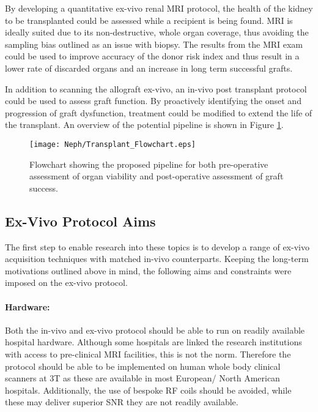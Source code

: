 By developing a quantitative ex-vivo renal \ac{MRI} protocol, the health of the kidney to be transplanted could be assessed while a recipient is being found. \ac{MRI} is ideally suited due to its non-destructive, whole organ coverage, thus avoiding the sampling bias outlined as an issue with biopsy. The results from the \ac{MRI} exam could be used to improve accuracy of the donor risk index and thus result in a lower rate of discarded organs and an increase in long term successful grafts. 

In addition to scanning the allograft ex-vivo, an in-vivo post transplant protocol could be used to assess graft function. By proactively identifying the onset and progression of graft dysfunction, treatment could be modified to extend the life of the transplant. An overview of the potential pipeline is shown in Figure \ref{fig:ex_transplant_flowchart}.
\begin{figure}[H]
	\centering
	\texttt{[image: Neph/Transplant\_Flowchart.eps]}
	\caption{Flowchart showing the proposed pipeline for both pre-operative assessment of organ viability and post-operative assessment of graft success.}
	\label{fig:ex_transplant_flowchart}	
\end{figure}

\newpage
\subsection{Ex-Vivo Protocol Aims}

The first step to enable research into these topics is to develop a range of ex-vivo acquisition techniques with matched in-vivo counterparts. Keeping the long-term motivations outlined above in mind, the following aims and constraints were imposed on the ex-vivo protocol.

\paragraph{Hardware:} Both the in-vivo and ex-vivo protocol should be able to run on readily available hospital hardware. Although some hospitals are linked the research institutions with access to pre-clinical \ac{MRI} facilities, this is not the norm. Therefore the protocol should be able to be implemented on human whole body clinical scanners at 3T as these are available in most European/ North American hospitals. Additionally, the use of bespoke \ac{RF} coils should be avoided, while these may deliver superior \ac{SNR} they are not readily available.

